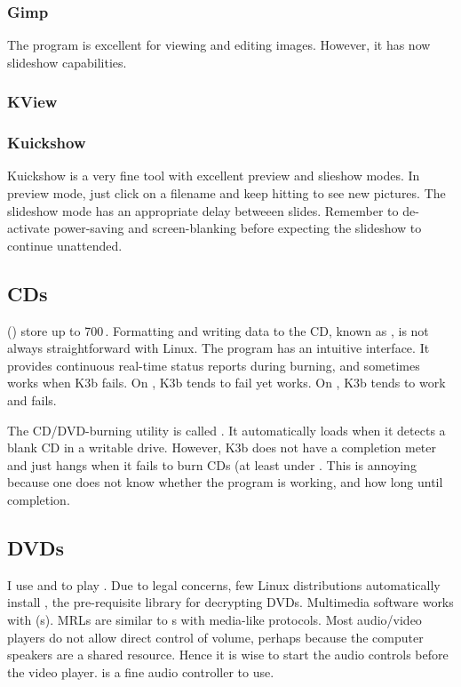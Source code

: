 \documentclass[12pt,twoside]{article}
\begin{document}
\subsubsection{Gimp}\label{sxn:gimp}
The  program is excellent for viewing and editing images.
However, it has now slideshow capabilities.

\subsubsection{KView}\label{sxn:kview}
\subsubsection{Kuickshow}\label{sxn:kuickshow}
Kuickshow is a very fine tool with excellent preview and slieshow
modes.
In preview mode, just click on a filename and keep hitting 
 to see new pictures.
The slideshow mode has an appropriate delay betweeen slides.
Remember to de-activate power-saving and screen-blanking before
expecting the slideshow to continue unattended.

\subsection{CDs}\label{sxn:cd}
 () store up to 700\,\MB.
Formatting and writing data to the CD, known as , is
not always straightforward with Linux.
The program  has an intuitive interface.
It provides continuous real-time status reports during burning, and
sometimes works when K3b fails.
On , K3b tends to fail yet
 works. 
On , K3b tends to work and 
 fails. 

The  CD/DVD-burning utility is called .
It automatically loads when it detects a blank CD in a writable drive.
However, K3b does not have a completion meter and just hangs when it
fails to burn CDs (at least under .  
This is annoying because one does not know whether the program is
working, and how long until completion.

\subsection{DVDs}\label{sxn:dvd}
I use  and  to play .
Due to legal concerns, few Linux distributions automatically install
, the pre-requisite library for decrypting DVDs.
Multimedia software works with 
(s). 
MRLs are similar to s with media-like protocols.
Most audio/video players do not allow direct control of volume,
perhaps because the computer speakers are a shared resource.
Hence it is wise to start the audio controls before the video player.
 is a fine audio controller to use.
\end{document}
